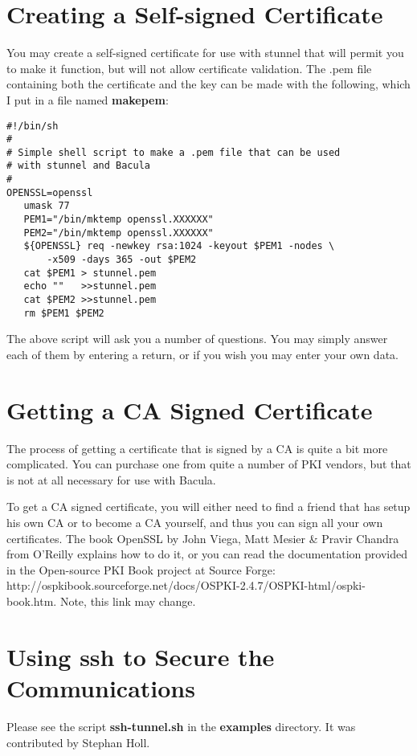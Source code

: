 \section{Creating a Self-signed Certificate}

You may create a self-signed certificate for use with stunnel that will permit
you to make it function, but will not allow certificate validation. The .pem
file containing both the certificate and the key can be made with the
following, which I put in a file named {\bf makepem}: 

\footnotesize
\begin{verbatim}
#!/bin/sh
#
# Simple shell script to make a .pem file that can be used
# with stunnel and Bacula
#
OPENSSL=openssl
   umask 77
   PEM1="/bin/mktemp openssl.XXXXXX"
   PEM2="/bin/mktemp openssl.XXXXXX"
   ${OPENSSL} req -newkey rsa:1024 -keyout $PEM1 -nodes \
       -x509 -days 365 -out $PEM2
   cat $PEM1 > stunnel.pem
   echo ""   >>stunnel.pem
   cat $PEM2 >>stunnel.pem
   rm $PEM1 $PEM2
\end{verbatim}
\normalsize

The above script will ask you a number of questions. You may simply answer
each of them by entering a return, or if you wish you may enter your own data.


\section{Getting a CA Signed Certificate}

The process of getting a certificate that is signed by a CA is quite a bit
more complicated. You can purchase one from quite a number of PKI vendors, but
that is not at all necessary for use with Bacula. 

To get a CA signed
certificate, you will either need to find a friend that has setup his own CA
or to become a CA yourself, and thus you can sign all your own certificates.
The book OpenSSL by John Viega, Matt Mesier \& Pravir Chandra from O'Reilly
explains how to do it, or you can read the documentation provided in the
Open-source PKI Book project at Source Forge: 
{http://ospkibook.sourceforge.net/docs/OSPKI-2.4.7/OSPKI-html/ospki-book.htm}.
Note, this link may change. 

\section{Using ssh to Secure the Communications}

Please see the script {\bf ssh-tunnel.sh} in the {\bf examples} directory. It
was contributed by Stephan Holl. 
